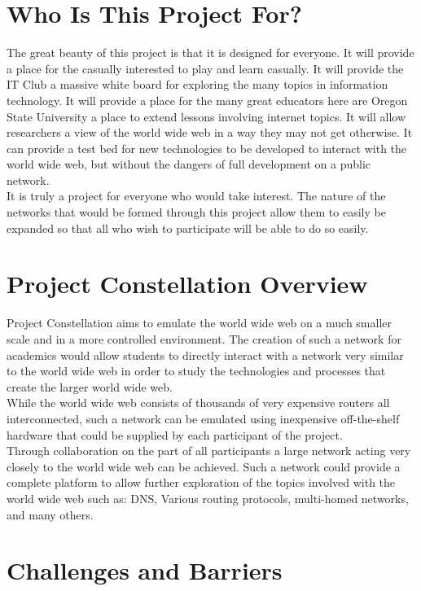 \documentclass[12pt]{article}
\begin{document}
\section{Who Is This Project For?}

The great beauty of this project is that it is designed for everyone. It will provide a place for the casually interested to play
and learn casually. It will provide the IT Club a massive white board for exploring the many topics in information technology. It will
provide a place for the many great educators here are Oregon State University a place to extend lessons involving internet topics. It
will allow researchers a view of the world wide web in a way they may not get otherwise. It can provide a test bed for new technologies
to be developed to interact with the world wide web, but without the dangers of full development on a public network.
\\

It is truly a project for everyone who would take interest. The nature of the networks that would be formed through this project 
allow them to easily be expanded so that all who wish to participate will be able to do so easily. 

\section{Project Constellation Overview}

Project Constellation aims to emulate the world wide web on a much smaller scale and in a more controlled
environment. The creation of such a network for academics would allow students to directly interact with a 
network very similar to the world wide web in order to study the technologies and processes that create the
larger world wide web.
\\

While the world wide web consists of thousands of very expensive routers all interconnected, such a network
can be emulated using inexpensive off-the-shelf hardware that could be supplied by each participant of the
project.
\\

Through collaboration on the part of all participants a large network acting very closely to the world wide 
web can be achieved. Such a network could provide a complete platform to allow further exploration of the topics
involved with the world wide web such as: DNS, Various routing protocols, multi-homed networks, and many others.

\section{Challenges and Barriers}
\end{document}
